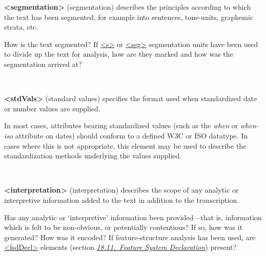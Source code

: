 \begin{description}
\begin{sansreflist}
\item [\textbf{<segmentation>}] (segmentation) describes the principles according to which the text has been segmented, for example into sentences, tone-units, graphemic strata, etc.
\end{sansreflist}
 \par
How is the text segmented? If \hyperref[TEI.s]{<s>} or \hyperref[TEI.seg]{<seg>} segmentation units have been used to divide up the text for analysis, how are they marked and how was the segmentation arrived at?
\item[{\hyperlink{TEI.stdVals}{}}]\hspace{1em}\hfill\linebreak
\mbox{}\\[-10pt] 
\begin{sansreflist}
  
\item [\textbf{<stdVals>}] (standard values) specifies the format used when standardized date or number values are supplied.
\end{sansreflist}
 \par
In most cases, attributes bearing standardized values (such as the {\itshape when} or {\itshape when-iso} attribute on dates) should conform to a defined W3C or ISO datatype. In cases where this is not appropriate, this element may be used to describe the standardization methods underlying the values supplied. 
\item[{\hyperlink{TEI.interpretation}{}}]\hspace{1em}\hfill\linebreak
\mbox{}\\[-10pt] 
\begin{sansreflist}
  
\item [\textbf{<interpretation>}] (interpretation) describes the scope of any analytic or interpretive information added to the text in addition to the transcription.
\end{sansreflist}
 \par
Has any analytic or ‘interpretive’ information been provided—that is, information which is felt to be non-obvious, or potentially contentious? If so, how was it generated? How was it encoded? If feature-structure analysis has been used, are \hyperref[TEI.fsdDecl]{<fsdDecl>} elements (section \textit{\hyperref[FD]{18.11.\ Feature System Declaration}}) present?
\end{description} \par
